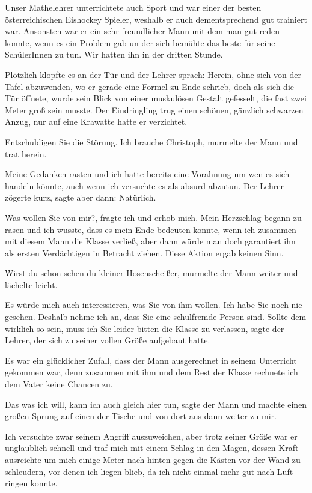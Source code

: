 \documentclass[11pt, a5paper]{article}
\newcommand{\E}{Christoph}
\begin{document}
\begin{spacing}{1.2}
		Unser Mathelehrer unterrichtete auch Sport und war einer der besten österreichischen Eishockey Spieler, weshalb er auch dementsprechend gut trainiert war. Ansonsten war er ein sehr freundlicher Mann mit dem man gut reden konnte, wenn es ein Problem gab un der sich bemühte das beste für seine SchülerInnen zu tun. Wir hatten ihn in der dritten Stunde.
		
		Plötzlich klopfte es an der Tür und der Lehrer sprach: \frqq Herein\flqq, ohne sich von der Tafel abzuwenden, wo er gerade eine Formel zu Ende schrieb, doch als sich die Tür öffnete, wurde sein Blick von einer muskulösen Gestalt gefesselt, die fast zwei Meter groß sein musste. Der Eindringling trug einen schönen, gänzlich schwarzen Anzug, nur auf eine Krawatte hatte er verzichtet.
		
		\frqq Entschuldigen Sie die Störung. Ich brauche \E \flqq, murmelte der Mann und trat herein.
		
		Meine Gedanken rasten und ich hatte bereits eine Vorahnung um wen es sich handeln könnte, auch wenn ich versuchte es als absurd abzutun. Der Lehrer zögerte kurz, sagte aber dann: \frqq Natürlich.\flqq
		
		\frqq Was wollen Sie von mir?\flqq, fragte ich und erhob mich. Mein Herzschlag begann zu rasen und ich wusste, dass es mein Ende bedeuten konnte, wenn ich zusammen mit diesem Mann die Klasse verließ, aber dann würde man doch garantiert ihn als ersten Verdächtigen in Betracht ziehen. Diese Aktion ergab keinen Sinn.
		
		\frqq Wirst du schon sehen du kleiner Hosenscheißer\flqq , murmelte der Mann weiter und lächelte leicht.
		
		\frqq Es würde mich auch interessieren, was Sie von ihm wollen. Ich habe Sie noch nie gesehen. Deshalb nehme ich an, dass Sie eine schulfremde Person sind. Sollte dem wirklich so sein, muss ich Sie leider bitten die Klasse zu verlassen\flqq, sagte der Lehrer, der sich zu seiner vollen Größe aufgebaut hatte.
		
		Es war ein glücklicher Zufall, dass der Mann ausgerechnet in seinem Unterricht gekommen war, denn zusammen mit ihm und dem Rest der Klasse rechnete ich dem Vater keine Chancen zu.
		
		\frqq Das was ich will, kann ich auch gleich hier tun\flqq , sagte der Mann und machte einen großen Sprung auf einen der Tische und von dort aus dann weiter zu mir.
		
		Ich versuchte zwar seinem Angriff auszuweichen, aber trotz seiner Größe war er unglaublich schnell und traf mich mit einem Schlag in den Magen, dessen Kraft ausreichte um mich einige Meter nach hinten gegen die Kästen vor der Wand zu schleudern, vor denen ich liegen blieb, da ich nicht einmal mehr gut nach Luft ringen konnte.
		

\end{spacing}
\end{document}
